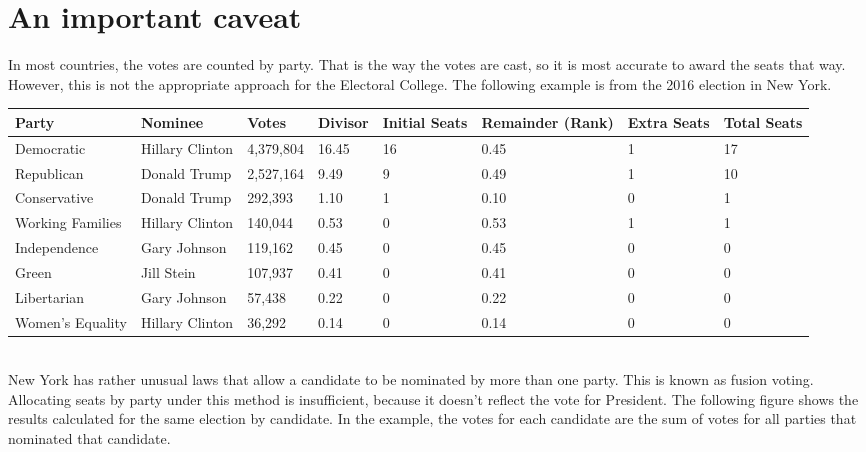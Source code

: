 \documentclass{article}
\begin{document}
    \section{An important caveat}%

    In most countries, the votes are counted by party. That is the way the votes are cast, so it is most accurate to award the seats that way. However, this is not the appropriate approach for the Electoral College. The following example is from the 2016 election in New York.\\

    \begin{adjustbox}{center}
    \begin{tabular}{ |l|l|l|l|l|l|l|l| }
        \hline
        Party & Nominee & Votes & Divisor & Initial Seats & Remainder (Rank) & Extra Seats & Total Seats \\
        \hline
        Democratic & Hillary Clinton & 4,379,804 & 16.45 & 16 & 0.45 & 1 & 17 \\
        \hline
        Republican & Donald Trump & 2,527,164 & 9.49 & 9 & 0.49 & 1 & 10 \\
        \hline
        Conservative & Donald Trump & 292,393 & 1.10 & 1 & 0.10 & 0 & 1 \\
        \hline
        Working Families & Hillary Clinton & 140,044 & 0.53 & 0 & 0.53 & 1 & 1 \\
        \hline
        Independence & Gary Johnson & 119,162 & 0.45 & 0 & 0.45 & 0 & 0 \\
        \hline
        Green & Jill Stein & 107,937 & 0.41 & 0 & 0.41 & 0 & 0 \\
        \hline
        Libertarian & Gary Johnson & 57,438 & 0.22 & 0 & 0.22 & 0 & 0 \\
        \hline
        Women's Equality & Hillary Clinton & 36,292 & 0.14 & 0 & 0.14 & 0 & 0 \\
        \hline
    \end{tabular}
    \end{adjustbox} \\

    New York has rather unusual laws that allow a candidate to be nominated by more than one party. This is known as fusion voting. Allocating seats by party under this method is insufficient, because it doesn't reflect the vote for President. The following figure shows the results calculated for the same election by candidate. In the example, the votes for each candidate are the sum of votes for all parties that nominated that candidate.\\
\end{document}
